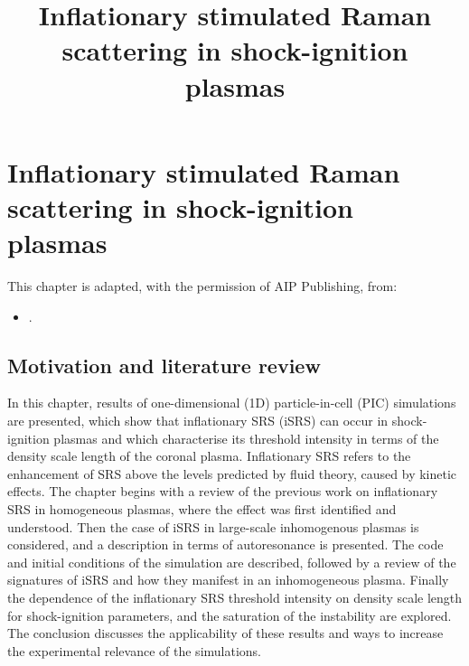 
\chapter{Inflationary stimulated Raman scattering in shock-ignition plasmas}
\label{chp:iSRS}
%

\title{Inflationary stimulated Raman scattering in shock-ignition plasmas}

This chapter is adapted, with the permission of AIP Publishing, from:
\begin{itemize}
  \item {}.
\end{itemize}

\section{Motivation and literature review}
In this chapter, results of one-dimensional (1D) particle-in-cell (PIC) simulations are presented, which show that inflationary SRS (iSRS) can occur in shock-ignition plasmas and which characterise its threshold intensity in terms of the density scale length of the coronal plasma. Inflationary SRS refers to the enhancement of SRS above the levels predicted by fluid theory, caused by kinetic effects. The chapter begins with a review of the previous work on inflationary SRS in homogeneous plasmas, where the effect was first identified and understood. Then the case of iSRS in large-scale inhomogenous plasmas is considered, and a description in terms of autoresonance is presented. The code and initial conditions of the simulation are described, followed by a review of the signatures of iSRS and how they manifest in an inhomogeneous plasma. Finally the dependence of the inflationary SRS threshold intensity on density scale length for shock-ignition parameters, and the saturation of the instability are explored. The conclusion discusses the applicability of these results and ways to increase the experimental relevance of the simulations.


